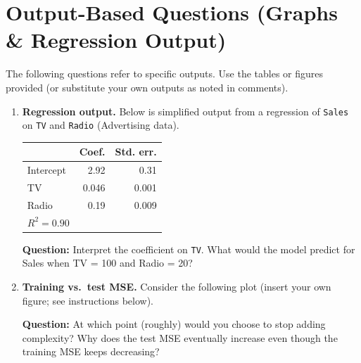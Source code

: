 \documentclass[11pt]{article}
\begin{document}
\newpage
\section*{Output-Based Questions (Graphs \& Regression Output)}

The following questions refer to specific outputs. Use the tables or figures provided (or substitute your own outputs as noted in comments).

\bigskip

\begin{enumerate}[leftmargin=*, resume]

\item \textbf{Regression output.} Below is simplified output from a regression of \texttt{Sales} on \texttt{TV} and \texttt{Radio} (Advertising data).
\begin{center}
\begin{tabular}{lrr}
\toprule
 & Coef. & Std. err. \\
\midrule
Intercept & 2.92 & 0.31 \\
TV & 0.046 & 0.001 \\
Radio & 0.19 & 0.009 \\
\midrule
$R^2 = 0.90$ & & \\
\bottomrule
\end{tabular}
\end{center}

\textbf{Question:} Interpret the coefficient on \texttt{TV}. What would the model predict for Sales when TV = 100 and Radio = 20?

\item \textbf{Training vs.\ test MSE.} Consider the following plot (insert your own figure; see instructions below).
\begin{center}
\end{center}
\textbf{Question:} At which point (roughly) would you choose to stop adding complexity? Why does the test MSE eventually increase even though the training MSE keeps decreasing?


\end{enumerate}
\end{document}
